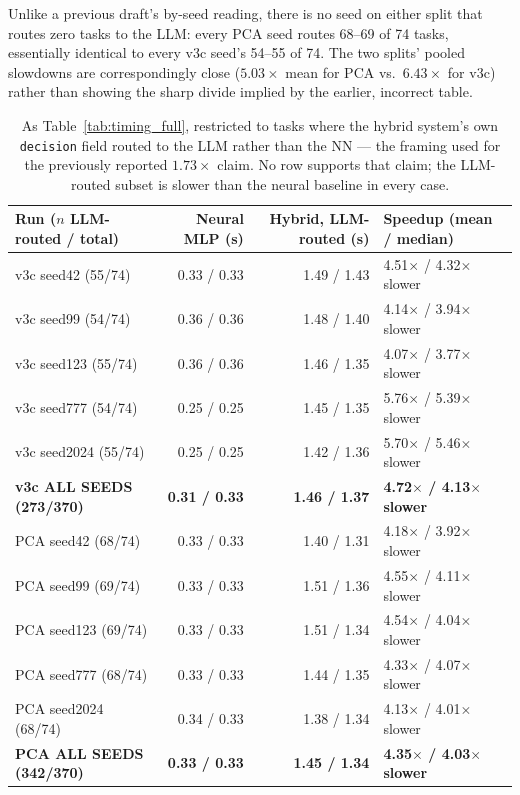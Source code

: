 \documentclass[twoside,11pt]{article}
\begin{document}
Unlike a previous draft's by-seed reading, there is no seed on either
split that routes zero tasks to the LLM: every PCA seed routes 68--69 of
74 tasks, essentially identical to every v3c seed's 54--55 of 74. The
two splits' pooled slowdowns are correspondingly close ($5.03\times$ mean
for PCA vs.\ $6.43\times$ for v3c) rather than showing the sharp
divide implied by the earlier, incorrect table.

\begin{table}[htbp]
\centering
\small
\caption{As Table~\ref{tab:timing_full}, restricted to tasks where the
hybrid system's own \texttt{decision} field routed to the LLM rather than
the NN --- the framing used for the previously reported $1.73\times$
claim. No row supports that claim; the LLM-routed subset is slower than
the neural baseline in every case.}
\label{tab:timing_llm_routed_full}
\begin{tabular}{lrrl}
\toprule
Run ($n$ LLM-routed / total) & Neural MLP (s) & Hybrid, LLM-routed (s) & Speedup (mean / median) \\
\midrule
v3c seed42 (55/74)  & 0.33 / 0.33 & 1.49 / 1.43 & 4.51$\times$ / 4.32$\times$ slower \\
v3c seed99 (54/74)  & 0.36 / 0.36 & 1.48 / 1.40 & 4.14$\times$ / 3.94$\times$ slower \\
v3c seed123 (55/74) & 0.36 / 0.36 & 1.46 / 1.35 & 4.07$\times$ / 3.77$\times$ slower \\
v3c seed777 (54/74) & 0.25 / 0.25 & 1.45 / 1.35 & 5.76$\times$ / 5.39$\times$ slower \\
v3c seed2024 (55/74) & 0.25 / 0.25 & 1.42 / 1.36 & 5.70$\times$ / 5.46$\times$ slower \\
\rowcolor{black!8}
\textbf{v3c ALL SEEDS (273/370)} & \textbf{0.31 / 0.33} & \textbf{1.46 / 1.37} & \textbf{4.72$\times$ / 4.13$\times$ slower} \\
PCA seed42 (68/74) & 0.33 / 0.33 & 1.40 / 1.31 & 4.18$\times$ / 3.92$\times$ slower \\
PCA seed99 (69/74) & 0.33 / 0.33 & 1.51 / 1.36 & 4.55$\times$ / 4.11$\times$ slower \\
PCA seed123 (69/74) & 0.33 / 0.33 & 1.51 / 1.34 & 4.54$\times$ / 4.04$\times$ slower \\
PCA seed777 (68/74) & 0.33 / 0.33 & 1.44 / 1.35 & 4.33$\times$ / 4.07$\times$ slower \\
PCA seed2024 (68/74) & 0.34 / 0.33 & 1.38 / 1.34 & 4.13$\times$ / 4.01$\times$ slower \\
\rowcolor{black!8}
\textbf{PCA ALL SEEDS (342/370)} & \textbf{0.33 / 0.33} & \textbf{1.45 / 1.34} & \textbf{4.35$\times$ / 4.03$\times$ slower} \\
\bottomrule
\end{tabular}
\end{table}
\end{document}
